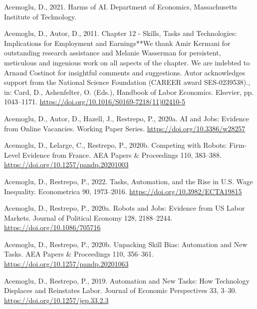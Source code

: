\documentclass[
  11,
  a4paperpaper,
]{article}
\newlength{\cslhangindent}
\newenvironment{CSLReferences}[2] %
 {\begin{list}{}{%
  \setlength{\itemindent}{0pt}
  \setlength{\leftmargin}{0pt}
  \setlength{\parsep}{0pt}
  \ifodd #1
   \setlength{\leftmargin}{\cslhangindent}
   \setlength{\itemindent}{-1\cslhangindent}
  \fi
  \setlength{\itemsep}{#2\baselineskip}}}
 {\end{list}}
\begin{document}
\label{refs}
\begin{CSLReferences}{1}{0}
Acemoglu, D., 2021. Harms of {AI}. Department of Economics,
Massachusetts Institute of Technology.

Acemoglu, D., Autor, D., 2011. Chapter 12 - {Skills}, {Tasks} and
{Technologies}: {Implications} for {Employment} and {Earnings}**{We}
thank {Amir} {Kermani} for outstanding research assistance and {Melanie}
{Wasserman} for persistent, meticulous and ingenious work on all aspects
of the chapter. {We} are indebted to {Arnaud} {Costinot} for insightful
comments and suggestions. {Autor} acknowledges support from the
{National} {Science} {Foundation} ({CAREER} award {SES}-0239538)., in:
Card, D., Ashenfelter, O. (Eds.), Handbook of {Labor} {Economics}.
Elsevier, pp. 1043--1171.
\url{https://doi.org/10.1016/S0169-7218(11)02410-5}

Acemoglu, D., Autor, D., Hazell, J., Restrepo, P., 2020a. {AI} and
{Jobs}: {Evidence} from {Online} {Vacancies}. Working {Paper} {Series}.
\url{https://doi.org/10.3386/w28257}

Acemoglu, D., Lelarge, C., Restrepo, P., 2020b. Competing with {Robots}:
{Firm}-{Level} {Evidence} from {France}. AEA Papers \& Proceedings 110,
383--388. \url{https://doi.org/10.1257/pandp.20201003}

Acemoglu, D., Restrepo, P., 2022. Tasks, {Automation}, and the {Rise} in
{U}.{S}. {Wage} {Inequality}. Econometrica 90, 1973--2016.
\url{https://doi.org/10.3982/ECTA19815}

Acemoglu, D., Restrepo, P., 2020a. Robots and {Jobs}: {Evidence} from
{US} {Labor} {Markets}. Journal of Political Economy 128, 2188--2244.
\url{https://doi.org/10.1086/705716}

Acemoglu, D., Restrepo, P., 2020b. Unpacking {Skill} {Bias}:
{Automation} and {New} {Tasks}. AEA Papers \& Proceedings 110, 356--361.
\url{https://doi.org/10.1257/pandp.20201063}

Acemoglu, D., Restrepo, P., 2019. Automation and {New} {Tasks}: {How}
{Technology} {Displaces} and {Reinstates} {Labor}. Journal of Economic
Perspectives 33, 3--30. \url{https://doi.org/10.1257/jep.33.2.3}


\end{CSLReferences}
\end{document}
